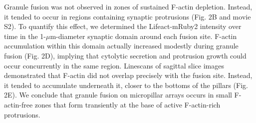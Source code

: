 Granule fusion was not observed in zones of sustained F-actin depletion. Instead, it tended to occur in regions containing synaptic protrusions (Fig. 2B and movie S2). To quantify this effect, we determined the Lifeact-mRuby2 intensity over time in the 1-$\mu$m-diameter synaptic domain around each fusion site. F-actin accumulation within this domain actually increased modestly during granule fusion (Fig. 2D), implying that cytolytic secretion and protrusion growth could occur concurrently in the same region. Linescans of sagittal slice images demonstrated that F-actin did not overlap precisely with the fusion site. Instead, it tended to accumulate underneath it, closer to the bottoms of the pillars (Fig. 2E). We conclude that granule fusion on micropillar arrays occurs in small F-actin-free zones that form transiently at the base of active F-actin-rich protrusions.




